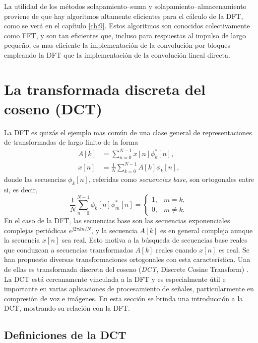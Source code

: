 \documentclass[a4paper]{report}
\begin{document}
La utilidad de los métodos solapamiento--suma y solapamiento--almacenamiento proviene de que hay algoritmos altamente eficientes para el cálculo de la DFT, como se verá en el capítulo \ref{ch:9}. Estos algoritmos son conocidos colectivamente como FFT, y son tan eficientes que, incluso para respuestas al impulso de largo pequeño, es mas eficiente la implementación de la convolución por bloques empleando la DFT que la implementación de la convolución lineal directa.

\section{La transformada discreta del coseno (DCT)}

La DFT es quizás el ejemplo mas común de una clase general de representaciones de transformadas de largo finito de la forma
\begin{align}
 A[k]&=\sum_{n=0}^{N-1}x[n]\phi_k^*[n],\label{sec:dft_dct_orthogonal_transform_analysis}\\
 x[n]&=\frac{1}{N}\sum_{k=0}^{N-1}A[k]\phi_k[n],\label{sec:dft_dct_orthogonal_transform_synthesis}
\end{align}
donde las secuencias \(\phi_k[n]\), referidas como \emph{secuencias base}, son ortogonales entre si, es decir,
\[
 \frac{1}{N}\sum_{n=0}^{N-1}\phi_k[n]\phi^*_m[n]=
 \left\{ 
 \begin{array}{ll}
  1, & m=k,\\
  0, & m\neq k.
 \end{array}
 \right.
\]
En el caso de la DFT, las secuencias base son las secuencias exponenciales complejas periódicas \(e^{j2\pi kn/N}\), y la secuencia \(A[k]\) es en general compleja aunque la secuencia \(x[n]\) sea real. Esto motiva a la búsqueda de secuencias base reales que conduzcan a secuencias transformadas \(A[k]\) reales cuando \(x[n]\) es real. Se han propuesto diversas transformaciones ortogonales con esta característica. Una de ellas es transformada discreta del coseno (\emph{DCT}, Discrete Cosine Transform) \cite{ahmed1974discrete}. La DCT está cercanamente vinculada a la DFT y es especialmente útil e importante en varias aplicaciones de procesamiento de señales, particularmente en compresión de voz e imágenes. En esta sección se brinda una introducción a la DCT, mostrando su relación con la DFT.

\subsection{Definiciones de la DCT}
\end{document}
